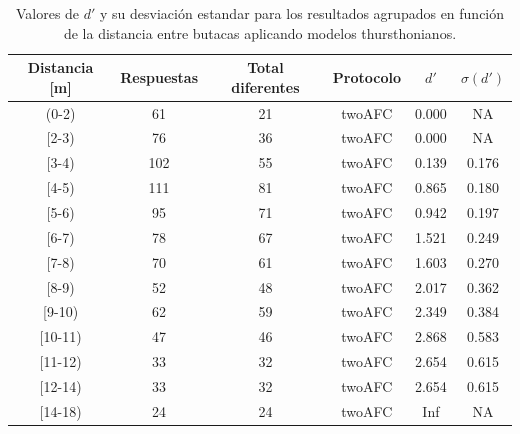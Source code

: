 \documentclass[11pt,a4paper,twoside]{book}
\begin{document}
            \begin{table}[H]
			\begin{center}
			\begin{scriptsize}
			\begin{tabular}{| c | c | c | c || c | c |}
			    \hline
				\textbf{Distancia [m]}&\textbf{Respuestas}&\textbf{Total diferentes}&\textbf{Protocolo}&\textbf{$d'$}&\textbf{$\sigma (d')$}\\ \hline
                (0-2)&61&21&twoAFC&0.000&NA\\ \hline
                [2-3)&76&36&twoAFC&0.000&NA\\ \hline
                [3-4)&102&55&twoAFC&0.139&0.176\\ \hline
                [4-5)&111&81&twoAFC&0.865&0.180\\ \hline
                [5-6)&95&71&twoAFC&0.942&0.197\\ \hline
                [6-7)&78&67&twoAFC&1.521&0.249\\ \hline
                [7-8)&70&61&twoAFC&1.603&0.270\\ \hline
                [8-9)&52&48&twoAFC&2.017&0.362\\ \hline
                [9-10)&62&59&twoAFC&2.349&0.384\\ \hline
                [10-11)&47&46&twoAFC&2.868&0.583\\ \hline
                [11-12)&33&32&twoAFC&2.654&0.615\\ \hline
                [12-14)&33&32&twoAFC&2.654&0.615\\ \hline
                [14-18)&24&24&twoAFC&Inf&NA\\ \hline
			\end{tabular}
			\caption{Valores de $d'$ y su desviación estandar para los resultados agrupados en función de la distancia entre butacas aplicando modelos thursthonianos.}
			\label{tablaThurstButacasDuda}
			\end{scriptsize}
			\end{center}	
		    \end{table}
		    
\end{document}
